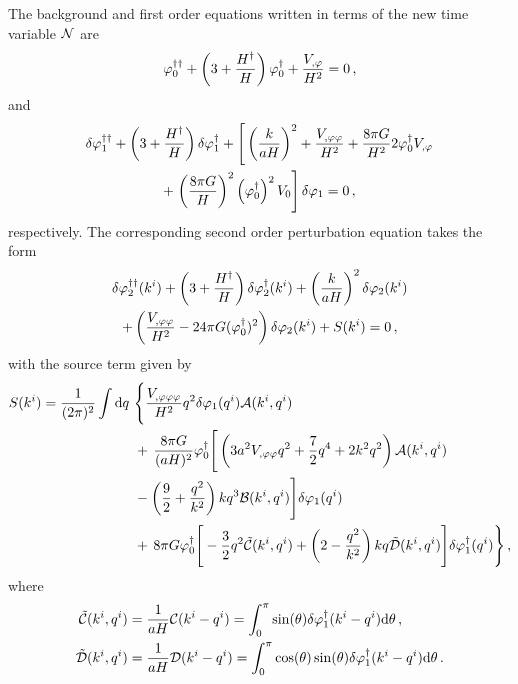 % 
The background and first order equations written in terms of the new time
variable $\mathcal{N}$ are
%
\begin{equation}
\varphi_{0}^{\dagger\dagger} + \left(3 + \frac{H^{\dagger}}{H}\right)\varphi_{0}^{\dagger} + \frac{V_{,\varphi}}{H^2} = 0
\,,
\label{eq:bgntime}
\end{equation}
% 
and
% 
\begin{multline}
\ddN{\dvp1} + \left(3 + \frac{\dN{H}}{H}\right)\dN{\dvp1} 
 + \Bigg[ \left(\frac{k}{aH}\right)^2 + \frac{\Upp}{H^2} + \frac{8\pi G}{H^2}
 2\dN{\vp_{0}}\Uphi \\
% 
+ \left.\left(\frac{8\pi G}{H}\right)^2
\left(\dN{\vp_{0}}\right)^2\U \right]\dvp1 = 0\,, \label{eq:fontime}
\end{multline}
% 
respectively.
The corresponding second order perturbation equation takes the form
% 
\begin{multline}
 \label{eq:KG2-fourier-sr-ntime}
\ddN{\dvp2}(\kvi) + \left(3 + \frac{\dN{H}}{H}\right)
\dN{\dvp2}(\kvi)+ \left(\frac{k}{aH}\right)^2\dvp2(\kvi) \\
% 
+ \left(\frac{\Upp}{H^2}-{24 \pi G}(\dN{\vp_{0}})^2\right)
\dvp2(\kvi) +S(\kvi) = 0 \,,
\end{multline}
% 
with the source term given by
\begin{align}
\label{eq:KG2-source-ntime}
S(\kvi) = \frac{1}{(2\pi)^2}\int \d q\ &\Bigg\{
\frac{\Uppp}{H^2} q^2 \dvp1(\qvi) \A(\kvi,\qvi) \nonumber\\
&+\, \frac{8\pi G}{(aH)^2}\dN{\vp_{0}} \Bigg[ 
\left( 3a^2\Upp q^2 + \frac{7}{2}q^4 + 2k^2q^2\right) \A(\kvi,\qvi) \nonumber\\
% 
&-\left(\frac{9}{2} + \frac{q^2}{k^2}\right)kq^3 \B(\kvi,\qvi)
\Bigg]\dvp1(\qvi) \nonumber\\
%
&+\, 8\pi G \dN{\vp_{0}} \Bigg[
-\frac{3}{2}q^2 \tilde{\C}(\kvi,\qvi) + \left(2-\frac{q^2}{k^2}\right)kq
\tilde{\D}(\kvi,\qvi) 
\Bigg]\dN{\dvp1}(\qvi) \Bigg\}\,,
%
\end{align}
%
where 
%
\begin{align}
\label{eq:cdtilde-num}
 \tilde{\mathcal{C}}(k^i,q^i) &= \frac{1}{aH} \mathcal{C}(k^i-q^i) = \int_0^\pi \sin(\theta)
\delta\varphi_{1}^{\dagger}(k^i-q^i) \mathrm{d}\theta \,,\nonumber \\
 \tilde{\mathcal{D}}(k^i,q^i) &= \frac{1}{aH} \mathcal{D}(k^i-q^i) = \int_0^\pi \cos(\theta)
\sin(\theta) \delta\varphi_{1}^{\dagger}(k^i-q^i)
\mathrm{d}\theta \,.
\end{align}



